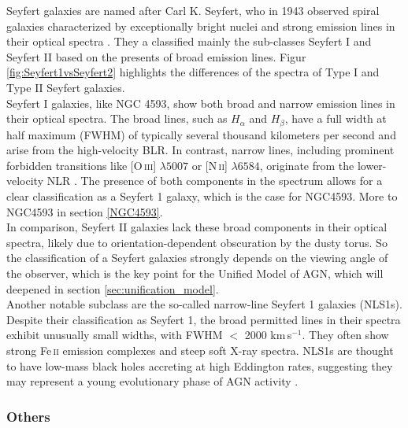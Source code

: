 Seyfert galaxies are named after Carl K. Seyfert, who in 1943 observed spiral galaxies characterized by exceptionally bright nuclei and strong emission lines in their optical spectra \parencite{seyfert1943nuclear}. They a classified mainly the sub-classes Seyfert I and Seyfert II based on the presents of broad emission lines. Figur \ref{fig:Seyfert1vsSeyfert2} highlights the differences of the spectra of Type I and Type II Seyfert galaxies.\\
Seyfert I galaxies, like NGC 4593, show both broad and narrow emission lines in their optical spectra. The broad lines, such as $H_\alpha$ and $H_\beta$, have a full width at half maximum (FWHM) of typically several thousand kilometers per second and arise from the high-velocity BLR. In contrast, narrow lines, including prominent forbidden transitions like [O\,\textsc{iii}] $\lambda5007$ or [N\,\textsc{ii}] $\lambda6584$, originate from the lower-velocity NLR \parencite{osterbrock1989agn, peterson1997introduction}. The presence of both components in the spectrum allows for a clear classification as a Seyfert 1 galaxy, which is the case for NGC4593. More to NGC4593 in section \ref{NGC4593}.\\
In comparison, Seyfert II galaxies lack these broad components in their optical spectra, likely due to orientation-dependent obscuration by the dusty torus. So the classification of a Seyfert galaxies strongly depends on the viewing angle of the observer, which is the key point for the Unified Model of AGN, which will deepened in section \ref{sec:unification_model}.\\ Another notable subclass are the so-called narrow-line Seyfert 1 galaxies (NLS1s). Despite their classification as Seyfert 1, the broad permitted lines in their spectra exhibit unusually small widths, with FWHM $<$ 2000 km\,s$^{-1}$. They often show strong Fe\,\textsc{ii} emission complexes and steep soft X-ray spectra. NLS1s are thought to have low-mass black holes accreting at high Eddington rates, suggesting they may represent a young evolutionary phase of AGN activity \parencite{osterbrock1985nls1, netzer2013agn}.



\subsubsection{Others}

